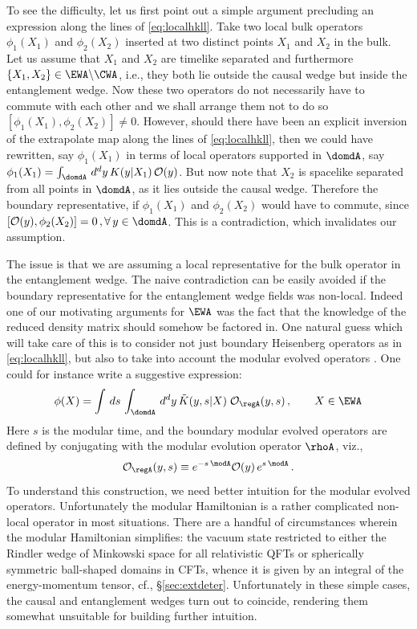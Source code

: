 \documentclass[12pt,openany]{book}
\begin{document}
 To see the difficulty, let us first point out a simple argument precluding an expression along the lines of \eqref{eq:localhkll}.  Take two local bulk operators  $\phi_1(X_1)$ and $\phi_2(X_2)$ inserted at two distinct points $X_1$ and $X_2$ in the bulk. Let us assume that
$X_1$ and $X_2$ are timelike separated and furthermore $\{X_1, X_2\} \in \EWA\backslash\CWA$, i.e., they both lie outside the causal wedge but inside the entanglement wedge. Now these two operators do not necessarily have to commute with each other and we shall  arrange them not to do so $[\phi_1(X_1), \phi_2(X_2)] \neq 0$.
However, should there have been an explicit inversion of the extrapolate map along the lines of \eqref{eq:localhkll}, then we could have rewritten, say $\phi_1(X_1)$ in terms of local operators supported in $\domdA$, say
$\phi_1(X_1) = \int_{\domdA} \, d^dy \, K(y|X_1) \,{\cal O}(y)$.
But now note that $X_2$ is spacelike separated from all points in $\domdA$, as it lies outside the causal wedge. Therefore  the boundary representative, if $\phi_1(X_1)$ and $\phi_2(X_2) $ would have to commute, since $[{\cal O}(y), \phi_2(X_2)] =0 \,, \forall \,y\in \domdA$. This is a contradiction, which invalidates our assumption.

The issue is that we are assuming a local representative for the bulk operator in the entanglement wedge. The naive contradiction can be easily avoided if the boundary representative for the entanglement wedge fields was non-local. Indeed one of our motivating arguments for $\EWA$ was the fact that the knowledge of the reduced density matrix should somehow be factored in. One natural guess which will take care of this is to consider not  just boundary Heisenberg operators as in \eqref{eq:localhkll}, but also to take into account the modular evolved operators \cite{Jafferis:2015del}. One could for instance write a suggestive expression:
%
\begin{equation}
\phi(X) = \int \, ds \, \int_{\domdA}\, d^dy\, \tilde{K}(y,s|X)\; {\cal O}_\regA(y,s) \,, \qquad X \in \EWA
\label{eq:jlmshkll}
\end{equation}
%
Here $s$ is the modular time, and the boundary modular evolved operators are defined by conjugating with the modular evolution operator $\rhoA$, viz.,
%
\begin{equation}
{\cal O}_\regA(y,s) \equiv e^{-s\, \modA}  {\cal O}(y)\, e^{s\, \modA}\,.
\label{eq:modops}
\end{equation}
%
To understand this construction, we need better intuition for the modular evolved operators. Unfortunately the modular Hamiltonian is a rather complicated non-local operator in most situations. There are a handful of circumstances wherein the modular Hamiltonian simplifies: the vacuum state restricted to either the  Rindler wedge of Minkowski space for all relativistic QFTs or spherically symmetric ball-shaped domains in CFTs, whence it is given by an integral of the energy-momentum tensor, cf., \S\ref{sec:extdeter}. Unfortunately in these simple cases, the causal and entanglement wedges turn out to coincide, rendering them somewhat unsuitable for building further intuition.
\end{document}
